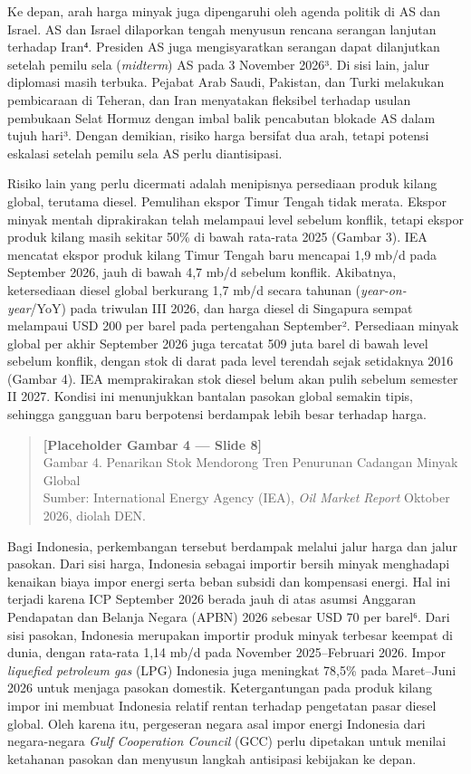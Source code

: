 \documentclass[
  manuscript=article,
  layout=brief,
  year=2026,
  volume=1,
]{den}
\begin{document}
Ke depan, arah harga minyak juga dipengaruhi oleh agenda politik di AS
dan Israel. AS dan Israel dilaporkan tengah menyusun rencana serangan
lanjutan terhadap Iran⁴. Presiden AS juga mengisyaratkan serangan dapat
dilanjutkan setelah pemilu sela (\emph{midterm}) AS pada 3 November
2026³. Di sisi lain, jalur diplomasi masih terbuka. Pejabat Arab Saudi,
Pakistan, dan Turki melakukan pembicaraan di Teheran, dan Iran
menyatakan fleksibel terhadap usulan pembukaan Selat Hormuz dengan imbal
balik pencabutan blokade AS dalam tujuh hari³. Dengan demikian, risiko
harga bersifat dua arah, tetapi potensi eskalasi setelah pemilu sela AS
perlu diantisipasi.

Risiko lain yang perlu dicermati adalah menipisnya persediaan produk
kilang global, terutama diesel. Pemulihan ekspor Timur Tengah tidak
merata. Ekspor minyak mentah diprakirakan telah melampaui level sebelum
konflik, tetapi ekspor produk kilang masih sekitar 50\% di bawah
rata-rata 2025 (Gambar 3). IEA mencatat ekspor produk kilang Timur
Tengah baru mencapai 1,9 mb/d pada September 2026, jauh di bawah 4,7
mb/d sebelum konflik. Akibatnya, ketersediaan diesel global berkurang
1,7 mb/d secara tahunan (\emph{year-on-year}/YoY) pada triwulan III
2026, dan harga diesel di Singapura sempat melampaui USD 200 per barel
pada pertengahan September². Persediaan minyak global per akhir
September 2026 juga tercatat 509 juta barel di bawah level sebelum
konflik, dengan stok di darat pada level terendah sejak setidaknya 2016
(Gambar 4). IEA memprakirakan stok diesel belum akan pulih sebelum
semester II 2027. Kondisi ini menunjukkan bantalan pasokan global
semakin tipis, sehingga gangguan baru berpotensi berdampak lebih besar
terhadap harga.

\begin{quote}
\textbf{{[}Placeholder Gambar 4 --- Slide 8{]}}\\
Gambar 4. Penarikan Stok Mendorong Tren Penurunan Cadangan Minyak
Global\\
Sumber: International Energy Agency (IEA), \emph{Oil Market Report}
Oktober 2026, diolah DEN.
\end{quote}

Bagi Indonesia, perkembangan tersebut berdampak melalui jalur harga dan
jalur pasokan. Dari sisi harga, Indonesia sebagai importir bersih minyak
menghadapi kenaikan biaya impor energi serta beban subsidi dan
kompensasi energi. Hal ini terjadi karena ICP September 2026 berada jauh
di atas asumsi Anggaran Pendapatan dan Belanja Negara (APBN) 2026
sebesar USD 70 per barel⁶. Dari sisi pasokan, Indonesia merupakan
importir produk minyak terbesar keempat di dunia, dengan rata-rata 1,14
mb/d pada November 2025--Februari 2026. Impor \emph{liquefied petroleum
gas} (LPG) Indonesia juga meningkat 78,5\% pada Maret--Juni 2026 untuk
menjaga pasokan domestik. Ketergantungan pada produk kilang impor ini
membuat Indonesia relatif rentan terhadap pengetatan pasar diesel
global. Oleh karena itu, pergeseran negara asal impor energi Indonesia
dari negara-negara \emph{Gulf Cooperation Council} (GCC) perlu dipetakan
untuk menilai ketahanan pasokan dan menyusun langkah antisipasi
kebijakan ke depan.
\end{document}
